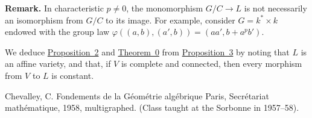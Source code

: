 \documentclass{article}
\newenvironment{rmenv}[1]
  {\phantomsection\par\medskip\noindent\textbf{#1.}\rmfamily}
  {\medskip}
\begin{document}
\begin{rmenv}{Remark}
  \marginpar{\dbend}
  In characteristic $p\neq0$, the monomorphism $G/C\to L$ is not necessarily an isomorphism from $G/C$ to its image.
  For example, consider $G=k^*\times k$ endowed with the group law $\varphi((a,b),(a',b))=(aa',b+a^pb')$.
\end{rmenv}

We deduce \hyperref[proposition2]{Proposition~2} and \hyperref[theorem0]{Theorem~0} from \hyperref[proposition3]{Proposition~3} by noting that $L$ is an affine variety, and that, if $V$ is complete and connected, then every morphism from $V$ to $L$ is constant.




\nocite{*}

\begin{thebibliography}{1}

  {Chevalley, C.}
  \newblock Fondements de la G\'{e}om\'{e}trie alg\'{e}brique
  \newblock Paris, Secr\'{e}tariat math\'{e}matique, 1958, multigraphed.
  \newblock (Class taught at the Sorbonne in 1957--58).

\end{thebibliography}
\end{document}
